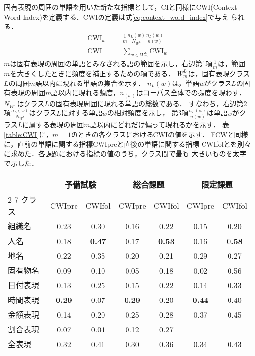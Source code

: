 固有表現の周囲の単語を用いた新たな指標として，CIと同様にCWI(Context
Word Index)を定義する．CWIの定義は式\ref{eq:context_word_index}で与え
られる．
\begin{eqnarray}\label{eq:context_word_index}
\mbox{CWI}_w & = & \frac{1}{m} \frac{n_L(w)}{N_{W^L}} \frac{n_L(w)}{n(w)} \nonumber \\
\mbox{CWI} & = & \sum_{w \in W^L_{m}} \mbox{CWI}_w
\end{eqnarray}
\(m\)は固有表現の周囲の単語とみなされる語の範囲を示し，右辺第1項\(\frac{1}{m}\)は，範囲\(m\)を大きくしたときに頻度を補正するための項である．
\(W^L_m\)は，固有表現クラス\(L\)の周囲\(m\)語以内に現れる単語の集合を示す．
\(n_L(w)\)は，単語\(w\)がクラス\(L\)の固有表現の周囲\(m\)語以内に現れる頻度，\(n_{(w)}\)はコーパス全体での頻度を現わす．
\(N_{W^L}\)はクラス\(L\)の固有表現周囲に現れる単語の総数である．
すなわち，右辺第2項\(\frac{n_L(w)}{N_{W^L}}\)はクラス\(L\)に対する単語\(w\)の相対頻度を示し，
第3項\(\frac{n_L(w)}{n(w)}\)は単語\(w\)がクラス\(L\)に属する表現の周囲\(m\)語以内にどれだけ偏って現れるかを示す．
表\ref{table:CWI}に，\(m=1\)のときの各クラスにおけるCWIの値を示す．
FCWと同様に，直前の単語に関する指標CWIpreと直後の単語に関する指標
CWIfolとを別々に求めた．各課題における指標の値のうち，クラス間で最も
大きいものを太字で示した．

\begin{table*}[t]\small
\caption{\label{table:CWI}各クラスのCWIの値\((m=1)\)}
\begin{center}
\begin{tabular}{|l||c|c|c|c|c|c|} \hline
         & \multicolumn{2}{|c|}{予備試験} & \multicolumn{2}{|c|}{総合課題} & \multicolumn{2}{|c|}{限定課題} \\ \cline{2-7}
クラス   &    CWIpre &    CWIfol &    CWIpre &    CWIfol &    CWIpre &    CWIfol  \\ \hline \hline
組織名   &      0.23 &      0.30 &      0.16 &      0.22 &      0.15 &      0.20  \\ \hline
人名     &      0.18 & {\bf 0.47}&      0.17 & {\bf 0.53}&      0.16 & {\bf 0.58} \\ \hline
地名     &      0.22 &      0.35 &      0.20 &      0.21 &      0.29 &      0.27  \\ \hline
固有物名 &      0.09 &      0.10 &      0.05 &      0.18 &      0.02 &      0.56  \\ \hline
日付表現 &      0.13 &      0.25 &      0.15 &      0.22 &      0.14 &      0.33  \\ \hline
時間表現 & {\bf 0.29}&      0.07 & {\bf 0.29}&      0.20 & {\bf 0.44}&      0.40  \\ \hline
金額表現 &      0.14 &      0.20 &      0.25 &      0.28 &      0.37 &      0.45  \\ \hline
割合表現 &      0.07 &      0.04 &      0.12 &      0.27 &       --- &       ---  \\ \hline \hline
全表現   &      0.32 &      0.41 &      0.30 &      0.36 &      0.34 &      0.43  \\ \hline
\end{tabular}
\end{center}
\end{table*}

